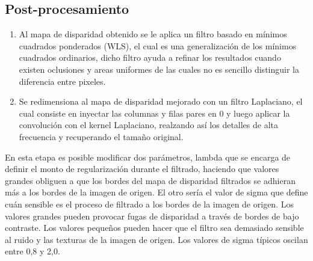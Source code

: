 \subsection{Post-procesamiento}
\begin{enumerate}
    \item Al mapa de disparidad obtenido se le aplica un filtro basado en mínimos cuadrados ponderados (WLS), el cual es una generalización de los mínimos cuadrados ordinarios, dicho filtro ayuda a refinar los resultados cuando existen oclusiones y areas uniformes de las cuales no es sencillo distinguir la diferencia entre pixeles.
    \item Se redimensiona al mapa de disparidad mejorado con un filtro Laplaciano, el cual consiste en inyectar las columnas y filas pares en 0 y luego aplicar la convolución con el kernel Laplaciano, realzando así los detalles de alta frecuencia y recuperando el tamaño original.
\end{enumerate}
En esta etapa es posible modificar dos parámetros, lambda que se encarga de definir el monto de regularización durante el filtrado, haciendo que valores grandes obliguen a que los bordes del mapa de disparidad filtrados se adhieran más a los bordes de la imagen de origen. El otro sería el valor de sigma que define cuán sensible es el proceso de filtrado a los bordes de la imagen de origen. Los valores grandes pueden provocar fugas de disparidad a través de bordes de bajo contraste. Los valores pequeños pueden hacer que el filtro sea demasiado sensible al ruido y las texturas de la imagen de origen. Los valores de sigma típicos oscilan entre 0,8 y 2,0.
